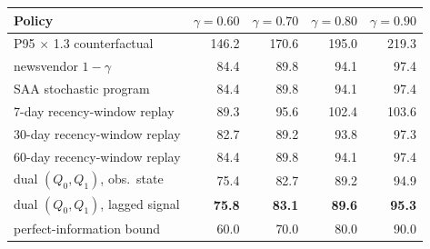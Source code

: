 \setlength{\tabcolsep}{4pt}
\begin{tabular}{@{}l r r r r @{}}
\toprule
Policy & $\gamma{=}0.60$ & $\gamma{=}0.70$ & $\gamma{=}0.80$ & $\gamma{=}0.90$ \\
\midrule
P95 $\times$ 1.3 counterfactual & 146.2 & 170.6 & 195.0 & 219.3 \\
newsvendor $1{-}\gamma$ & 84.4 & 89.8 & 94.1 & 97.4 \\
SAA stochastic program & 84.4 & 89.8 & 94.1 & 97.4 \\
7-day recency-window replay & 89.3 & 95.6 & 102.4 & 103.6 \\
30-day recency-window replay & 82.7 & 89.2 & 93.8 & 97.3 \\
60-day recency-window replay & 84.4 & 89.8 & 94.1 & 97.4 \\
dual $(Q_0,Q_1)$, obs.\ state & 75.4 & 82.7 & 89.2 & 94.9 \\
dual $(Q_0,Q_1)$, lagged signal & \textbf{75.8} & \textbf{83.1} & \textbf{89.6} & \textbf{95.3} \\
perfect-information bound & 60.0 & 70.0 & 80.0 & 90.0 \\
\bottomrule
\end{tabular}
